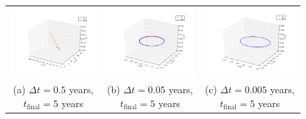 \documentclass{article}
\begin{document}
\begin{multicols}{2}
\begin{figure}
\begin{center}
\begin{tabular}{ccc}
  	\includegraphics[width=60mm]{Images/Earth-Sun/EarthSun_orbit_05_tfinal5.png}
	& \includegraphics[width=60mm]{Images/Earth-Sun/EarthSun_orbit_005_tfinal5.png} 
	& \includegraphics[width=60mm]{Images/Earth-Sun/EarthSun_orbit_0005_tfinal5.png}\\
	(a) $\Delta t = 0.5$ years, $t_{\mathrm{final}} = 5$ years		& (b) $\Delta t = 0.05$ years, $t_{\mathrm{final}} = 5$ years  	& (c) $\Delta t = 0.005$ years, $t_{\mathrm{final}} = 5$ years\\[6pt]
	

\end{tabular}
\end{center}
\end{figure}
\end{multicols}
\end{document}

